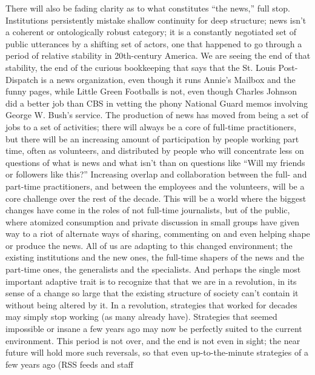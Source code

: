 There will also be fading clarity as to what constitutes ``the news,'' full stop.
Institutions persistently mistake shallow continuity for deep structure; news isn’t
a coherent or ontologically robust category; it is a constantly negotiated set of
public utterances by a shifting set of actors, one that happened to go through a
period of relative stability in 20th-century America. We are seeing the end of
that stability, the end of the curious bookkeeping that says that the St. Louis Post-
Dispatch is a news organization, even though it runs Annie’s Mailbox and the
funny pages, while Little Green Footballs is not, even though Charles Johnson
did a better job than CBS in vetting the phony National Guard memos involving
George W. Bush’s service.
The production of news has moved from being a set of jobs to a set of activities;
there will always be a core of full-time practitioners, but there will be an increasing
amount of participation by people working part time, often as volunteers, and
distributed by people who will concentrate less on questions of what is news and
what isn’t than on questions like ``Will my friends or followers like this?'' Increasing
overlap and collaboration between the full- and part-time practitioners, and
between the employees and the volunteers, will be a core challenge over the rest
of the decade.
This will be a world where the biggest changes have come in the roles of not
full-time journalists, but of the public, where atomized consumption and private
discussion in small groups have given way to a riot of alternate ways of sharing,
commenting on and even helping shape or produce the news.
All of us are adapting to this changed environment; the existing institutions and
the new ones, the full-time shapers of the news and the part-time ones, the generalists
and the specialists. And perhaps the single most important adaptive trait
is to recognize that that we are in a revolution, in its sense of a change so large
that the existing structure of society can’t contain it without being altered by it.
In a revolution, strategies that worked for decades may simply stop working (as
many already have). Strategies that seemed impossible or insane a few years ago
may now be perfectly suited to the current environment. This period is not over,
and the end is not even in sight; the near future will hold more such reversals,
so that even up-to-the-minute strategies of a few years ago (RSS feeds and staff

